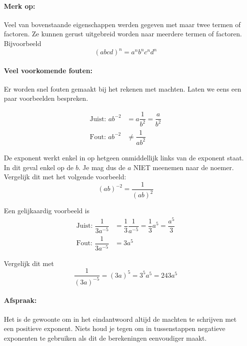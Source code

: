 \documentclass[12pt,twoside]{article}
\begin{document}
\paragraph{Merk op:} Veel van bovenstaande eigenschappen werden gegeven met maar twee termen of factoren. Ze kunnen gerust uitgebreid worden naar meerdere termen of factoren. Bijvoorbeeld $$(abcd)^n=a^nb^nc^nd^n$$

\paragraph{Veel voorkomende fouten:} Er worden snel fouten gemaakt bij het rekenen met machten. Laten we eens een paar voorbeelden bespreken.

\begin{align*}
  \text{Juist: } ab^{-2} &= a\dfrac{1}{b^2} = \dfrac{a}{b^2}\\
  \text{Fout:  } ab^{-2} &\neq \dfrac{1}{ab^2}
\end{align*}

De exponent werkt enkel in op hetgeen onmiddellijk links van de exponent staat. In dit geval enkel op de $b$. Je mag dus de $a$ NIET meenemen naar de noemer. Vergelijk dit met het volgende voorbeeld:
$$ (ab)^{-2} = \dfrac{1}{(ab)^2} $$

Een gelijkaardig voorbeeld is
\begin{align*}
  \text{Juist: } \dfrac{1}{3a^{-5}} &= \dfrac{1}{3}\dfrac{1}{a^{-5}} = \dfrac{1}{3}a^5 = \dfrac{a^5}{3}\\
  \text{Fout:  } \dfrac{1}{3a^{-5}} &= 3a^5
\end{align*}

Vergelijk dit met
$$\dfrac{1}{(3a)^{-5}} = (3a)^5 = 3^5 a^5 = 243 a^5$$

\paragraph{Afspraak:} Het is de gewoonte om in het eindantwoord altijd de machten te schrijven met een positieve exponent. Niets houd je tegen om in tussenstappen negatieve exponenten te gebruiken als dit de berekeningen eenvoudiger maakt.
\end{document}
